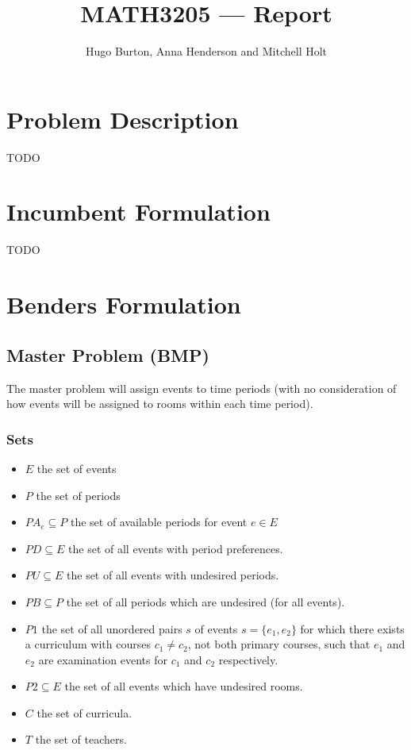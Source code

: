 \documentclass{article}
\title{MATH3205 — Report}
\author{Hugo Burton, Anna Henderson and Mitchell Holt}
\theoremstyle{plain}
\numberwithin{theorem}{section}
\numberwithin{example}{section}
\theoremstyle{definition}
\begin{document}
\maketitle

\tableofcontents

\newpage

\section{Problem Description}
TODO

\section{Incumbent Formulation}
TODO

\section{Benders Formulation}
\subsection{Master Problem (BMP)}
The master problem will assign events to time periods (with no consideration of
how events will be assigned to rooms within each time period).

\subsubsection*{Sets}
\begin{itemize}
    \item $E$ the set of events
    \item $P$ the set of periods
    \item $PA_e \subseteq P$ the set of available periods for event $e \in E$
    \item $PD \subseteq E$ the set of all events with period preferences.
    \item $PU \subseteq E$ the set of all events with undesired periods.
    \item $PB \subseteq P$ the set of all periods which are undesired (for all
        events).
    \item $P1$ the set of all unordered pairs $s$ of events $s = \{e_1, e_2\}$
        for which there exists a curriculum with courses $c_1 \neq c_2$, not
        both primary courses, such that $e_1$ and $e_2$ are examination events
        for $c_1$ and $c_2$ respectively.
    \item $P2 \subseteq E$ the set of all events which have undesired rooms.
    \item $C$ the set of curricula.
    \item $T$ the set of teachers.
\end{itemize}
\end{document}
